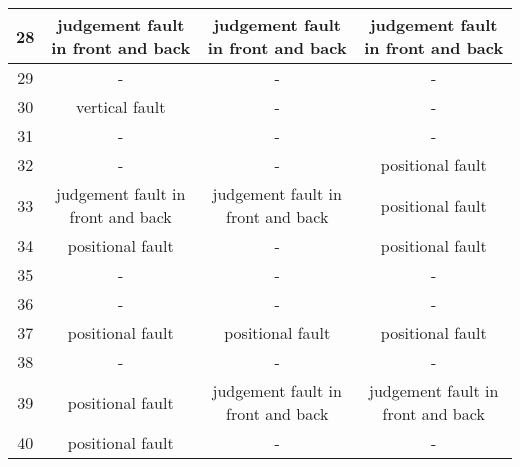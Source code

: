 \begin{table*}[ht]
{\begin{tabular}{|c|c|c|c|}
        28              & judgement fault in front and back & judgement fault in front and back & judgement fault in front and back \\ \hline
        29              & -                                 & -                                 & -                                 \\ \hline
        30              & vertical fault                    & -                                 & -                                 \\ \hline
        31              & -                                 & -                                 & -                                 \\ \hline
        32              & -                                 & -                                 & positional fault                  \\ \hline
        33              & judgement fault in front and back & judgement fault in front and back & positional fault                  \\ \hline
        34              & positional fault                  & -                                 & positional fault                  \\ \hline
        35              & -                                 & -                                 & -                                 \\ \hline
        36              & -                                 & -                                 & -                                 \\ \hline
        37              & positional fault                  & positional fault                  & positional fault                  \\ \hline
        38              & -                                 & -                                 & -                                 \\ \hline
        39              & positional fault                  & judgement fault in front and back & judgement fault in front and back \\ \hline
        40              & positional fault                  & -                                 & -                                 \\ \hline
        \end{tabular}%
        }
    \end{table*}
